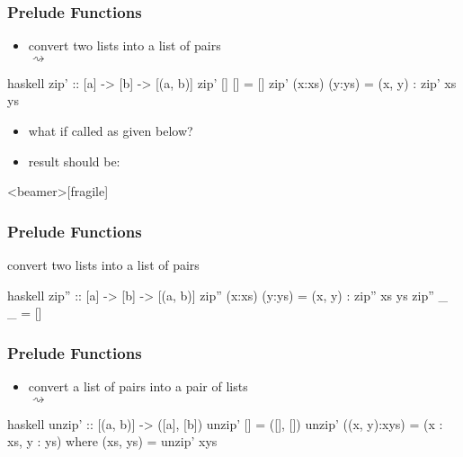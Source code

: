 \documentclass[dvipsnames]{beamer}
\theoremstyle{plain}
\begin{document}
\begin{frame}[fragile]
  \frametitle{Prelude Functions}

  \begin{itemize}
    \item convert two lists into a list of pairs\\
       $\rightsquigarrow$
  \end{itemize}

  \begin{exampleblock}{}
    \begin{pygments}{haskell}
zip' :: [a] -> [b] -> [(a, b)]
zip' [] [] = []
zip' (x:xs) (y:ys) = (x, y) : zip' xs ys
    \end{pygments}
  \end{exampleblock}

  \pause
  \begin{itemize}
    \item what if called as given below?\\
    \item result should be: 
  \end{itemize}
\end{frame}

\begin{frame}<beamer>[fragile]
  \frametitle{Prelude Functions}

  \begin{exampleblock}{convert two lists into a list of pairs}
    \begin{pygments}{haskell}
zip'' :: [a] -> [b] -> [(a, b)]
zip'' (x:xs) (y:ys) = (x, y) : zip'' xs ys
zip'' _ _ = []
    \end{pygments}
  \end{exampleblock}
\end{frame}

\begin{frame}[fragile]
  \frametitle{Prelude Functions}

  \begin{itemize}
    \item convert a list of pairs into a pair of lists\\
       $\rightsquigarrow$
  \end{itemize}

  \begin{exampleblock}{}
    \begin{pygments}{haskell}
unzip' :: [(a, b)] -> ([a], [b])
unzip' [] = ([], [])
unzip' ((x, y):xys) = (x : xs, y : ys)
  where
    (xs, ys) = unzip' xys
    \end{pygments}
  \end{exampleblock}
\end{frame}
\end{document}
